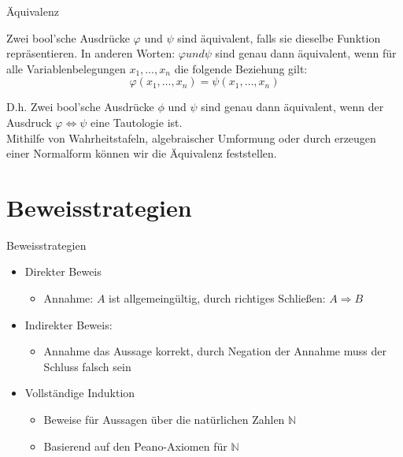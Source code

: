\documentclass[12pt%
,aspectratio=169%
]{beamer}
\begin{document}
\begin{frame}{Äquivalenz}
\begin{definition}[Äquivalenz]
Zwei bool'sche Ausdrücke $\varphi$ und $\psi$ sind äquivalent, falls sie dieselbe Funktion repräsentieren. In anderen Worten: $\varphi und \psi$ sind genau dann äquivalent, wenn für alle Variablenbelegungen $x_1 , \ldots, x_n$ die folgende Beziehung gilt:
$$ \varphi (x_1,\ldots, x_n) = \psi(x_1, \ldots, x_n)$$
\end{definition}
D.h. Zwei bool'sche Ausdrücke $\phi$ und $\psi$ sind genau dann äquivalent, wenn der Ausdruck $\varphi \Leftrightarrow \psi$ eine Tautologie ist.\\
Mithilfe von Wahrheitstafeln, algebraischer Umformung oder durch erzeugen einer Normalform können wir die Äquivalenz feststellen.
\end{frame}

\section{Beweisstrategien}
\begin{frame}{Beweisstrategien}
\begin{itemize}
	\item Direkter Beweis
	\begin{itemize}
		\item Annahme: $A$ ist allgemeingültig, durch richtiges Schließen: $A \Rightarrow B$
	\end{itemize}
	\item Indirekter Beweis:
	\begin{itemize}
		\item Annahme das Aussage korrekt, durch Negation der Annahme muss der Schluss falsch sein
	\end{itemize}
	\item Vollständige Induktion
	\begin{itemize}
		\item Beweise für Aussagen über die natürlichen Zahlen $\mathbb{N}$
		\item Basierend auf den Peano-Axiomen für $\mathbb{N}$
	\end{itemize}
\end{itemize}
\end{frame}
\end{document}
